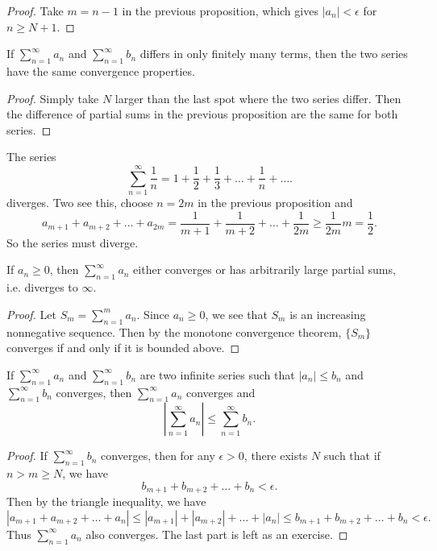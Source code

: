 \begin{proof}
  Take $m = n - 1$ in the previous proposition, which
  gives $|a_n| < \epsilon$ for $n \ge N + 1$.
\end{proof}

\begin{corollary}
  If $\sum_{n = 1}^\infty a_n$ and $\sum_{n = 1}^\infty b_n$
  differs in only finitely many terms, then the
  two series have the same convergence properties.
\end{corollary}

\begin{proof}
  Simply take $N$ larger than the last spot where
  the two series differ. Then the difference of
  partial sums in the previous proposition are the same
  for both series.
\end{proof}

\begin{example}
  The series
  \[
    \sum_{n = 1}^\infty \frac{1}{n} = 1 + \frac{1}{2} + \frac{1}{3} + \dots + \frac{1}{n} + \dots.
  \]
  diverges. Two see this, choose $n = 2m$ in the
  previous proposition and
  \[
    a_{m + 1} + a_{m + 2} + \dots + a_{2m}
    = \frac{1}{m + 1} + \frac{1}{m + 2} + \dots + \frac{1}{2m}
    \ge \frac{1}{2m} m = \frac{1}{2}.
  \]
  So the series must diverge.
\end{example}

\begin{prop}
  If $a_n \ge 0$, then
  $\sum_{n = 1}^\infty a_n$ either converges or
  has arbitrarily large partial sums, i.e. diverges to $\infty$.
\end{prop}

\begin{proof}
  Let $S_m = \sum_{n = 1}^m a_n$. Since $a_n \ge 0$,
  we see that $S_m$ is an increasing nonnegative sequence.
  Then by the monotone convergence theorem,
  $\{S_m\}$ converges if and only if it is bounded above.
\end{proof}

\begin{prop}
  If $\sum_{n = 1}^\infty a_n$ and $\sum_{n = 1}^\infty b_n$
  are two infinite series such that
  $|a_n| \le b_n$ and $\sum_{n = 1}^\infty b_n$ converges,
  then $\sum_{n = 1}^\infty a_n$ converges and
  \[
    \left| \sum_{n = 1}^\infty a_n \right| \le \sum_{n = 1}^\infty b_n.
  \]
\end{prop}

\begin{proof}
  If $\sum_{n = 1}^\infty b_n$ converges, then
  for any $\epsilon > 0$, there exists $N$ such that
  if $n > m \ge N$, we have
  \[
    b_{m + 1} + b_{m + 2} + \dots + b_n < \epsilon.
  \]
  Then by the triangle inequality, we have
  \[
    |a_{m + 1} + a_{m + 2} + \dots + a_n|
    \le |a_{m + 1}| + |a_{m + 2}| + \dots + |a_n|
    \le b_{m + 1} + b_{m + 2} + \dots + b_n < \epsilon.
  \]
  Thus $\sum_{n = 1}^\infty a_n$ also converges.
  The last part is left as an exercise.
\end{proof}

